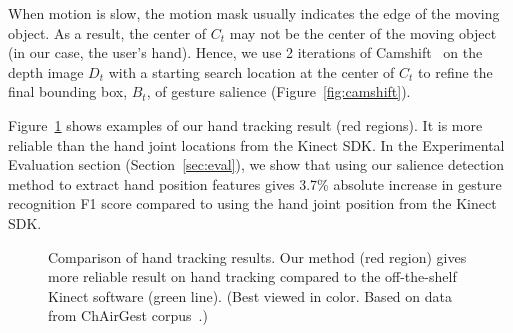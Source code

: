 When motion is slow, the motion mask usually indicates the edge of the moving
object. As a result, the center of $C_t$ may not be the center of the moving
object (in our case, the user's hand). Hence, we use 2 iterations of Camshift~\cite{Bradski98} on
the depth image $D_t$ with a starting search location at the center of $C_t$ to refine
the final bounding box, $B_t$, of gesture salience (Figure~\ref{fig:camshift}).

Figure~\ref{fig:compare-skeleton} shows examples of our hand tracking result (red regions).
It is more reliable than the hand joint locations from the Kinect SDK. In the
Experimental Evaluation section (Section~\ref{sec:eval}), we show that using our
salience detection method to extract hand position features gives 3.7\%
absolute increase in gesture recognition F1 score compared to using the hand
joint position from the Kinect SDK.

\begin{figure}
\centering
{}
\caption{Comparison of hand tracking results. Our method (red region) gives more
reliable result on hand tracking compared to the off-the-shelf Kinect software
(green line). (Best viewed in color. Based on data from ChAirGest
corpus~\cite{Ruffieux2013}.)}
\label{fig:compare-skeleton}
\end{figure}